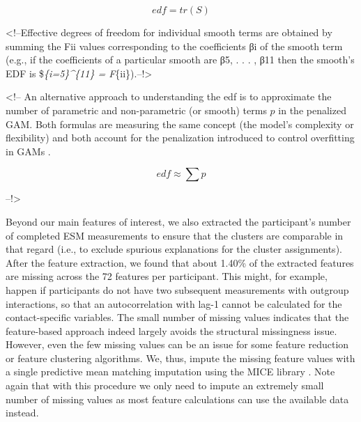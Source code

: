 \begin{equation} \label{eq:df}
  edf = tr(S)
\end{equation}

\textless!--Effective degrees of freedom for individual smooth terms are
obtained by summing the Fii values corresponding to the coefficients βi
of the smooth term (e.g., if the coefficients of a particular smooth are
β5, . . . , β11 then the smooth's EDF is \$\sum\emph{\{i=5\}\^{}\{11\} =
F}\{ii\}).--!\textgreater{}

\textless!-- An alternative approach to understanding the edf is to
approximate the number of parametric and non-parametric (or smooth)
terms \(p\) in the penalized GAM. Both formulas are measuring the same
concept (the model's complexity or flexibility) and both account for the
penalization introduced to control overfitting in GAMs
\citep{hastie1986}.

\begin{equation} \label{eq:edf}
  edf \approx \sum p
\end{equation}

--!\textgreater{}

Beyond our main features of interest, we also extracted the
participant's number of completed ESM measurements to ensure that the
clusters are comparable in that regard (i.e., to exclude spurious
explanations for the cluster assignments). After the feature extraction,
we found that about 1.40\% of the extracted features are missing across
the 72 features per participant. This might, for example, happen if
participants do not have two subsequent measurements with outgroup
interactions, so that an autocorrelation with lag-1 cannot be calculated
for the contact-specific variables. The small number of missing values
indicates that the feature-based approach indeed largely avoids the
structural missingness issue. However, even the few missing values can
be an issue for some feature reduction or feature clustering algorithms.
We, thus, impute the missing feature values with a single predictive
mean matching imputation using the MICE library \citep[][]{buuren2011}.
Note again that with this procedure we only need to impute an extremely
small number of missing values as most feature calculations can use the
available data instead.
